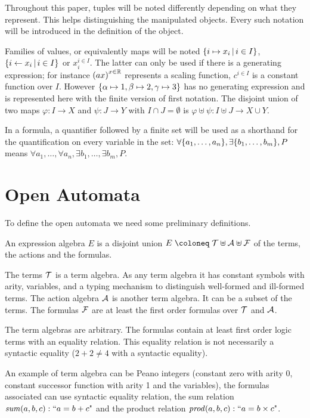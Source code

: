 \documentclass{article}
\begin{document}
Throughout this paper, tuples will be noted differently depending on what they represent.
This helps distinguishing the manipulated objects.
Every such notation will be introduced in the definition of the object.

Families of values, or equivalently maps will be noted \({\left\{i \mapsto x_i\,\middle|\, i \in I\right\}}\), \({\left\{i \gets x_i\,\middle|\, i \in I\right\}}\) or \(x_i^{i \in I}\).
The latter can only be used if there is a generating expression; for instance \({\left(ax\right)}^{x \in \mathbb{R}}\) represents a scaling function, \(c^{i \in I}\) is a constant function over \(I\).
However \({\left\{\alpha \mapsto 1, \beta \mapsto 2, \gamma \mapsto 3\right\}}\) has no generating expression and is represented here with the finite version of first notation.
The disjoint union of two maps \(\varphi: I \to X\) and \(\psi: J \to Y\) with \(I \cap J = \emptyset\) is \(\varphi \uplus \psi: I \uplus J \to X \cup Y\).

In a formula, a quantifier followed by a finite set will be used as a shorthand for the quantification on every variable in the set:
\(\forall {\left\{a_1, \dots, a_n\right\}}, \exists {\left\{b_1, \dots, b_m\right\}}, P\) means \(\forall a_1, \dots, \forall a_n, \exists b_1, \dots, \exists b_m, P\).


\section{Open Automata}\label{sec:def}
To define the open automata we need some preliminary definitions.
\begin{defi}
An expression algebra \(E\) is a disjoint union \(E \defobject \terms \uplus \actions \uplus \formulas\) of the terms, the actions and the formulas.

The terms \({\mathcal{T}}\) is a term algebra.
As any term algebra it has constant symbols with arity, variables, and a typing mechanism to distinguish well-formed and ill-formed terms.
The action algebra \(\mathcal{A}\) is another term algebra.
It can be a subset of the terms.
The formulas \({\mathcal{F}}\) are at least the first order formulas over \({\mathcal{T}}\) and \(\mathcal{A}\).
\end{defi}
The term algebras are arbitrary.
The formulas contain at least first order logic terms with an equality relation.
This equality relation is not necessarily a syntactic equality (\(2 + 2 \neq 4\) with a syntactic equality).

An example of term algebra can be Peano integers (constant zero with arity 0, constant successor function with arity 1 and the variables), the formulas associated can use syntactic equality relation, the sum relation \(\mathit{sum}{\left(a, b, c\right)}: \text{``}a = b + c\text{"}\) and the product relation \(\mathit{prod}{\left(a, b, c\right)}: \text{``}a = b \times c\text{"}\).
\end{document}
